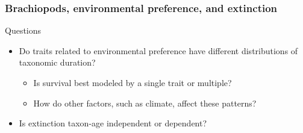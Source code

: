 \documentclass{beamer}
\begin{document}
\begin{frame}
  \frametitle{Brachiopods, environmental preference, and extinction}

  \begin{block}{Questions}
    \begin{itemize}
      \item Do traits related to environmental preference have different distributions of taxonomic duration? 
        \begin{itemize}
          \item Is survival best modeled by a single trait or multiple? 
          \item How do other factors, such as climate, affect these patterns? 
        \end{itemize}
      \item Is extinction taxon-age independent or dependent?
    \end{itemize}
  \end{block}
\end{frame}
\end{document}
